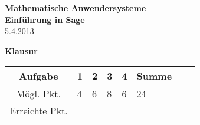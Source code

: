 \usepackage[svgnames]{xcolor} %



\parindent0cm 




\begin{center}
\textbf{\LARGE Mathematische Anwendersysteme }\\
\textbf{\LARGE Einführung in Sage}\\
\medskip
5.4.2013
\end{center}

\begin{center}
\Huge \textbf{Klausur}
\end{center}
\bigskip\bigskip\bigskip
\Large
\begin{center}
\begin{tabular}{|Sl||p{0.5cm}|p{0.5cm}|p{0.5cm}|p{0.5cm}|Sc|}
\hline
Aufgabe & \textbf{1} & \textbf{2} & \textbf{3} & \textbf{4} &  \textbf{Summe}\\
\hline
Mögl. Pkt. &  4  & 6  & 8  & 6     &  24  \\
\hline
Erreichte Pkt. &    &   &   &   &    \\
\hline
\end{tabular}
\end{center}

